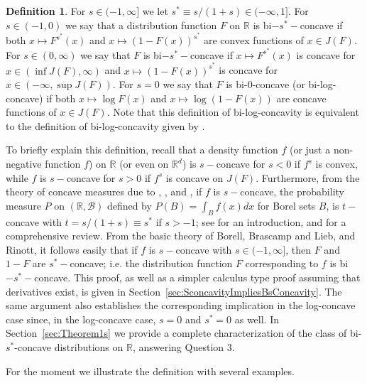 \documentclass[11pt]{amsart}
\numberwithin{equation}{section}
\newcommand{\RR}{\mathbb{R}}
\theoremstyle{definition}\newtheorem{definition}{Definition}
\theoremstyle{remark}\newtheorem{assumption}{Assumption}
\theoremstyle{remark}\newtheorem{remark}{Remark}
\theoremstyle{definition}\newtheorem{example}{Example}
\theoremstyle{plain}\newtheorem{question}{Question}
\theoremstyle{plain}\newtheorem{theorem}{Theorem}
\theoremstyle{plain}\newtheorem{lemma}{Lemma}
\theoremstyle{plain}\newtheorem{proposition}{Proposition}
\theoremstyle{plain}\newtheorem{corollary}{Corollary}
\theoremstyle{plain}\newtheorem{conjecture}{Conjecture}
\begin{document}
\begin{definition}
\label{defn:BiSConcaveDefn}  
For $s \in (-1,\infty]$ we let $s^* \equiv s/(1+s) \in (-\infty, 1]$. 
For $s \in (-1,0)$ we say that a distribution function $F$ on $\RR$ is bi$-s^*-$concave  if both 
$x\mapsto F^{s^*} (x) $ and $x \mapsto (1-F(x))^{s^*}$ are convex functions of $x \in J(F)$.
For $s \in (0,\infty)$ we say that  $F$  is bi$-s^*-$concave  if
$x\mapsto F^{s^*} (x) $ is concave for $x \in (\inf J(F), \infty)$ 
and $x \mapsto (1-F(x))^{s^*}$  is concave for $x \in (-\infty, \sup J(F))$. 
For $s = 0$ we say that $F$ is bi-$0$-concave (or bi-log-concave) if both $x \mapsto \log F(x)$ 
and $x \mapsto \log (1-F(x))$ are concave functions of $x \in J(F)$.  Note that this definition of 
bi-log-concavity 
is equivalent to the definition of bi-log-concavity given by \cite{DuembgenKW:2017}.
\end{definition} 
\smallskip

To briefly explain this definition, recall that a density function $f$ (or just a non-negative function $f$) 
on $\RR$ (or even on $\RR^d$) is $s-$concave 
for $s < 0$ if $f^s$ is convex, while  $f$ is $s-$concave for $s>0$ if $f^s$ is concave on $J(F)$.
Furthermore, from the theory of concave measures due to 
\cite{MR0404559},   %
\cite{MR0450480},  %
and 
\cite{MR0428540},  %
 if $f$ is $s-$concave, the probability measure $P$ on $(\RR,\mathcal{B} )$ defined 
by $P(B) = \int_B f(x) dx$ for Borel sets $B$, is $t - $concave with $t = s/(1+s) \equiv s^*$ if $s>-1$; 
see \cite{MR954608}  %
for an introduction, and \cite{MR1898210}  %
for a comprehensive review.   
 From  the basic theory of Borell, Brascamp and Lieb, and Rinott,
 it follows easily that if $f$ is $s-$concave with $s \in (-1,\infty]$, then $F$ and $1-F$ are 
 $s^*-$concave; i.e.  the distribution function $F$ corresponding to $f$ is bi$-s^*-$concave.  
 This proof, as well as a simpler calculus type proof assuming that derivatives exist,  
 is given in Section~\ref{sec:SconcavityImpliesBsConcavity}.
 The same argument also establishes the corresponding implication in the log-concave case 
 since, in the log-concave case, $s=0$  and $s^* = 0$ as well.  
 In Section~\ref{sec:Theorem1s} we provide a complete characterization of the class of bi-$s^*$-concave distributions 
 on $\RR$, answering Question 3.  
 
 For the moment we illustrate the definition with several examples.
\end{document}

